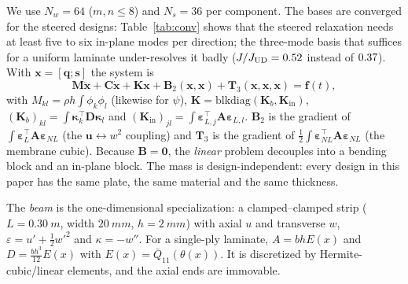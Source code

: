 We use $N_w=64$ ($m,n\le8$) and $N_s=36$ per component. The bases are converged
for the steered designs: Table~\ref{tab:conv} shows that the steered relaxation needs at least
five to six in-plane modes per direction; the three-mode basis that suffices for a uniform
laminate under-resolves it badly ($J/J_{\mathrm{UD}}=0.52$ instead of $0.37$).
With $\bm x=[\bm q;\bm s]$ the system is
\begin{equation}
\bm M\ddot{\bm x}+\bm C\dot{\bm x}+\bm K\bm x+\bm B_2(\bm x,\bm x)+\bm T_3(\bm x,\bm x,\bm x)=\bm f(t),
\label{eq:eom}
\end{equation}
with
$M_{kl}=\rho h\int\phi_k\phi_l$ (likewise for $\psi$),
$\bm K=\mathrm{blkdiag}(\bm K_b,\bm K_{\mathrm{in}})$,
$(\bm K_b)_{kl}=\int\bm\kappa_k^{\!\top}\bm D\bm\kappa_l$ and
$(\bm K_{\mathrm{in}})_{jl}=\int\bm\varepsilon_{L,j}^{\!\top}\bm A\bm\varepsilon_{L,l}$.
$\bm B_2$ is the gradient of $\int\bm\varepsilon_L^{\!\top}\bm A\bm\varepsilon_{NL}$ (the
$\bm u\leftrightarrow w^2$ coupling) and $\bm T_3$ is the gradient of
$\tfrac12\int\bm\varepsilon_{NL}^{\!\top}\bm A\bm\varepsilon_{NL}$ (the membrane cubic).
Because $\bm B=\bm 0$, the \emph{linear} problem decouples into a bending block and an
in-plane block. The mass is design-independent: every design in this paper has the
same plate, the same material and the same thickness.

The \emph{beam} is the one-dimensional specialization: a clamped--clamped strip
($L=\SI{0.30}{m}$, width $\SI{20}{mm}$, $h=\SI{2}{mm}$) with axial $u$ and transverse
$w$, $\varepsilon=u'+\tfrac12w'^2$ and $\kappa=-w''$. For a single-ply laminate,
$A=bhE(x)$ and $D=\tfrac{bh^3}{12}E(x)$ with $E(x)=\bar Q_{11}(\theta(x))$. It is
discretized by Hermite-cubic/linear elements, and the axial ends are immovable.

